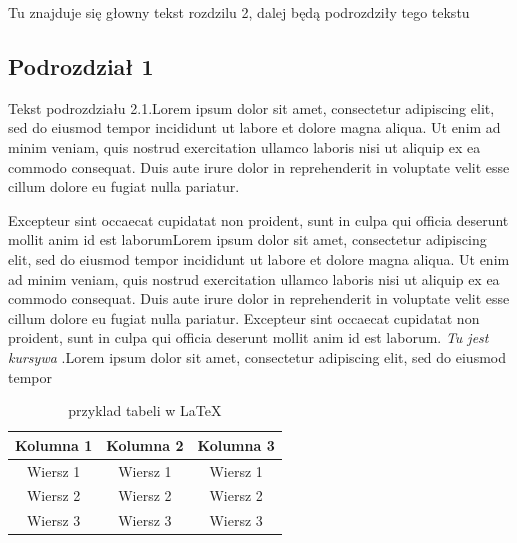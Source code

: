 \documentclass[12pt,a4paper,titlepage]{article}
\begin{document}
Tu znajduje się głowny tekst rozdzilu 2, dalej będą podrozdziły tego tekstu

\subsection{Podrozdział 1}

Tekst podrozdziału 2.1.Lorem ipsum dolor sit amet, consectetur adipiscing elit, sed do eiusmod tempor incididunt ut labore et dolore magna aliqua. Ut enim ad minim veniam, quis nostrud exercitation ullamco laboris nisi ut aliquip ex ea commodo consequat. Duis aute irure dolor in reprehenderit in voluptate velit esse cillum dolore eu fugiat nulla pariatur. \par Excepteur sint occaecat cupidatat non proident, sunt in culpa qui officia deserunt mollit anim id est laborumLorem ipsum dolor sit amet, consectetur adipiscing elit, sed do eiusmod tempor incididunt ut labore et dolore magna aliqua.  Ut enim ad minim veniam, quis nostrud exercitation ullamco laboris nisi ut aliquip ex ea commodo consequat. Duis aute irure dolor in reprehenderit in voluptate velit esse cillum dolore eu fugiat nulla pariatur. Excepteur sint occaecat cupidatat non proident, sunt in culpa qui officia deserunt mollit anim id est laborum.  \textit{Tu jest kursywa} .Lorem ipsum dolor sit amet, consectetur adipiscing elit, sed do eiusmod tempor 


\begin{table}[h]
\centering
\begin{tabular}{|c c c|}
\hline
Kolumna 1 & Kolumna 2 & Kolumna 3 \\
\hline
Wiersz 1 & Wiersz 1 & Wiersz 1 \\ \hline
Wiersz 2 & Wiersz 2 & Wiersz 2 \\ \hline
Wiersz 3 & Wiersz 3 & Wiersz 3 \\ 
\hline
\end{tabular}
\caption{przyklad tabeli w \LaTeX{}}
\label{tab:tabelka1}
\end{table}
\end{document}
